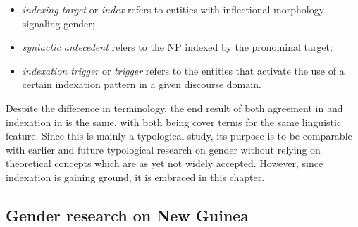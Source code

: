 \documentclass[output=collectionpaper]{langsci/langscibook}
\begin{document}
\begin{itemize}
\item \textit{indexing target} or \textit{index} refers to entities with inflectional morphology signaling gender;
\item \textit{syntactic antecedent} refers to the NP indexed by the pronominal target;
\item \textit{indexation trigger} or \textit{trigger} refers to the entities that activate the use of a certain indexation pattern in a given discourse domain.
\end{itemize}

Despite the difference in terminology, the end result of both agreement in \citet{Corbett1991} and indexation in \citet{DiGarbo2014} is the same, with both being cover terms for the same linguistic feature. Since this is mainly a typological study, its purpose is to be comparable with earlier and future typological research on gender without relying on theoretical concepts which are as yet not widely accepted. However, since indexation is gaining ground, it is embraced in this chapter.

\subsection{Gender research on New Guinea}
\end{document}
